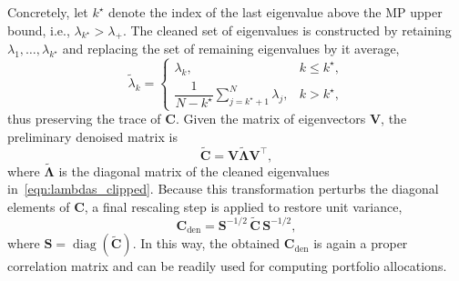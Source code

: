 \documentclass[pdflatex,sn-basic]{sn-jnl}%
\theoremstyle{thmstyleone}%
\theoremstyle{thmstyletwo}%
\theoremstyle{thmstylethree}%
\newcommand{\bV}{\boldsymbol{V}}
\newcommand{\bC}{\boldsymbol{C}}
\newcommand{\bS}{\boldsymbol{S}}
\newcommand{\bLambda}{\boldsymbol{\Lambda}}
\begin{document}
Concretely, let $k^{\star}$ denote the index of the last eigenvalue above the MP upper bound, i.e., $\lambda_{k^{\star}} > \lambda_{+}$. The cleaned set of eigenvalues is constructed by retaining $\lambda_1,\ldots,\lambda_{k^{\star}}$ and replacing the set of remaining eigenvalues by it average,
\begin{equation}
\label{eqn:lambdas_clipped}
    \tilde{\lambda}_k=
    \begin{cases}
    \lambda_k, & k \le k^{\star},\\
    \dfrac{1}{N-k^{\star}}\displaystyle\sum\limits_{j=k^{\star}+1}^{N}\lambda_j, & k>k^{\star},
    \end{cases}
\end{equation}
thus preserving the trace of $\bC$.  Given the matrix of eigenvectors $\bV$, the preliminary denoised matrix is
\begin{equation}
    \tilde{\bC} = \bV\tilde{\bLambda}\bV^\top,    
\end{equation}
where $\tilde{\bLambda}$ is the diagonal matrix of the cleaned eigenvalues in~\eqref{eqn:lambdas_clipped}. Because this transformation perturbs the diagonal elements of $\bC$, a final rescaling step is applied to restore unit variance,
\begin{equation}
\label{eqn:denoised_corr_mat}
    \bC_{\mathrm{den}}
=
\bS^{-1/2}
\,\tilde{\bC}\,
\bS^{-1/2},
\end{equation}
where $\bS = \operatorname{diag}(\tilde{\bC})$. In this way, the obtained $\bC_{\mathrm{den}}$ is again a proper correlation matrix and can be readily used for computing portfolio allocations. 
\end{document}
